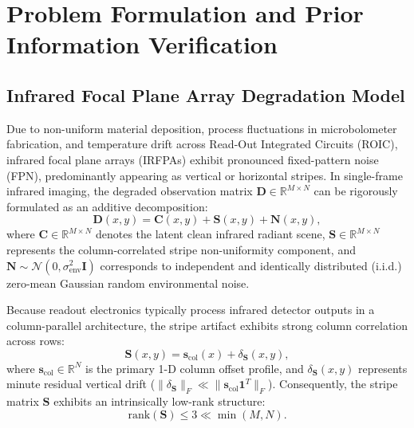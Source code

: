 
\section{Problem Formulation and Prior Information Verification}
\label{sec:problem_formulation}

\subsection{Infrared Focal Plane Array Degradation Model}
\label{subsec:degradation_model}
Due to non-uniform material deposition, process fluctuations in microbolometer fabrication, and temperature drift across Read-Out Integrated Circuits (ROIC), infrared focal plane arrays (IRFPAs) exhibit pronounced fixed-pattern noise (FPN), predominantly appearing as vertical or horizontal stripes. In single-frame infrared imaging, the degraded observation matrix $\mathbf{D} \in \mathbb{R}^{M \times N}$ can be rigorously formulated as an additive decomposition:
\begin{equation}
\label{eq:degradation_model}
\mathbf{D}(x, y) = \mathbf{C}(x, y) + \mathbf{S}(x, y) + \mathbf{N}(x, y),
\end{equation}
where $\mathbf{C} \in \mathbb{R}^{M \times N}$ denotes the latent clean infrared radiant scene, $\mathbf{S} \in \mathbb{R}^{M \times N}$ represents the column-correlated stripe non-uniformity component, and $\mathbf{N} \sim \mathcal{N}(0, \sigma_{\mathrm{env}}^2 \mathbf{I})$ corresponds to independent and identically distributed (i.i.d.) zero-mean Gaussian random environmental noise.

Because readout electronics typically process infrared detector outputs in a column-parallel architecture, the stripe artifact exhibits strong column correlation across rows:
\begin{equation}
\label{eq:stripe_formulation}
\mathbf{S}(x, y) = \mathbf{s}_{\mathrm{col}}(x) + \delta_{\mathbf{S}}(x, y),
\end{equation}
where $\mathbf{s}_{\mathrm{col}} \in \mathbb{R}^N$ is the primary 1-D column offset profile, and $\delta_{\mathbf{S}}(x, y)$ represents minute residual vertical drift ($\|\delta_{\mathbf{S}}\|_F \ll \|\mathbf{s}_{\mathrm{col}}\mathbf{1}^T\|_F$). Consequently, the stripe matrix $\mathbf{S}$ exhibits an intrinsically low-rank structure:
\begin{equation}
\mathrm{rank}(\mathbf{S}) \le 3 \ll \min(M, N).
\end{equation}

